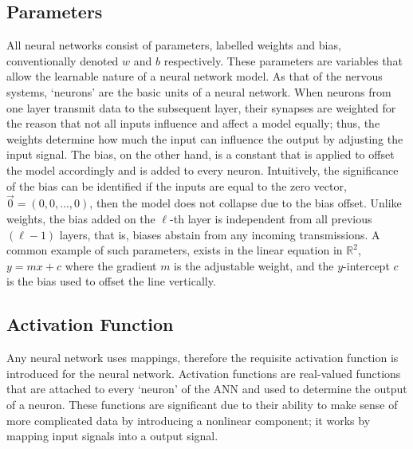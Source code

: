 \subsection{Parameters}\label{sec:para}   
All neural networks consist of parameters, labelled weights and bias, conventionally denoted $w$ and $b$ respectively. These parameters are variables that allow the learnable nature of a neural network model. As that of the nervous systems, `neurons' are the basic units of a neural network. When neurons from one layer transmit data to the subsequent layer, their synapses are weighted for the reason that not all inputs influence and affect a model equally; thus, the weights determine how much the input can influence the output by adjusting the input signal. The bias, on the other hand, is a constant that is applied to offset the model accordingly and is added to every neuron. Intuitively, the significance of the bias can be identified if the inputs are equal to the zero vector, $\Vec{0}=(0,0,...,0)$, then the model does not collapse due to the bias offset. Unlike weights, the bias added on the $\ell$-th layer is independent from all previous $(\ell-1)$ layers, that is, biases abstain from any incoming transmissions. A common example of such parameters, exists in the linear equation in $\mathbb{R}^2$, $y=mx+c$ where the gradient $m$ is the adjustable weight, and the $y$-intercept $c$ is the bias used to offset the line vertically.
    
\subsection{Activation Function}\label{sec:activation}
Any neural network uses mappings, therefore the requisite activation function is introduced for the neural network. Activation functions are real-valued functions that are attached to every `neuron' of the ANN and used to determine the output of a neuron. These functions are significant  due to their ability to make sense of more complicated data by introducing a nonlinear component; it works by mapping input signals into a output signal.

